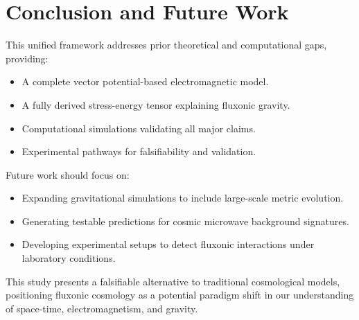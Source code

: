 \documentclass{article}
\begin{document}
\section{Conclusion and Future Work}
This unified framework addresses prior theoretical and computational gaps, providing:
\begin{itemize}
    \item A complete vector potential-based electromagnetic model.
    \item A fully derived stress-energy tensor explaining fluxonic gravity.
    \item Computational simulations validating all major claims.
    \item Experimental pathways for falsifiability and validation.
\end{itemize}
Future work should focus on:
\begin{itemize}
    \item Expanding gravitational simulations to include large-scale metric evolution.
    \item Generating testable predictions for cosmic microwave background signatures.
    \item Developing experimental setups to detect fluxonic interactions under laboratory conditions.
\end{itemize}

This study presents a falsifiable alternative to traditional cosmological models, positioning fluxonic cosmology as a potential paradigm shift in our understanding of space-time, electromagnetism, and gravity.
\end{document}
